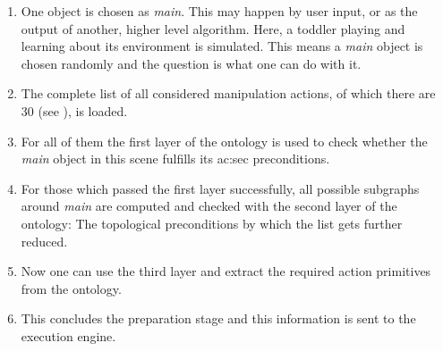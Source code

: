 \begin{enumerate}
  \item One object is chosen as \emph{main}. This may happen by user input, or as the output of another, higher level algorithm. Here, a toddler playing and learning about its environment is simulated. This means a \emph{main} object is chosen randomly and the question is what one can do with it.
  \item The complete list of all considered manipulation actions, of which there are 30 (see ), is loaded.
  \item For all of them the first layer of the ontology is used to check wheth\-er the \emph{main} object in this scene fulfills its \gls{ac:sec} preconditions. 
  \item For those which passed the first layer successfully, all possible subgraphs around \emph{main} are computed and checked with the second layer of the ontology: The topological preconditions by which the list gets further reduced.
  \item Now one can use the third layer and extract the required action primitives from the ontology.
  \item This concludes the preparation stage and this information is sent to the execution engine.
\end{enumerate}

